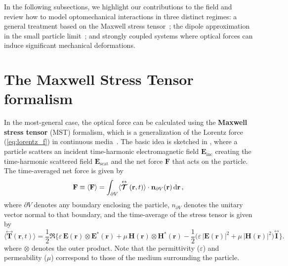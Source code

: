  In the following subsections, we highlight our contributions to the field and review how to model optomechanical interactions in three distinct regimes: a general treatment based on the Maxwell stress tensor~\cite{ownpub2}; 
 the dipole approximation in the small particle limit~\cite{ownpub1, ownpub3}; and strongly coupled systems where optical forces can induce significant mechanical deformations.
\section{The Maxwell Stress Tensor formalism~\cite{ownpub2}}

In the most-general case, the optical force can be calculated using the \textbf{Maxwell stress tensor} (MST) formalism, which is a generalization of the Lorentz force (\eqref{eq:lorentz_f}) in continuous media~\cite{novotny}.
The basic idea is sketched in , where
a particle scatters an incident time-harmonic electromagnetic field $\mathbf{E}_\text{inc}$ creating the time-harmonic scattered field $\mathbf{E}_\text{scat}$ and the net force $\mathbf{F}$ that acts
on the particle. The time-averaged net force is given by~\cite{novotny}
\begin{equation}\label{eq:f_MST}
    \mathbf{F} \equiv \langle\mathbf{F}\rangle=\int_{\partial V}\langle\stackrel{\leftrightarrow}{\bm{\mathcal{T}}}(\mathbf{r}, t)\rangle \cdot \mathbf{n}_{\partial V}(\mathbf{r}) \mathop{}\!\text{d} \mathbf{r}\,,
\end{equation}
where $\partial V$ denotes any boundary enclosing the particle, $n_{\partial V}$ denotes the unitary vector normal to that boundary, and
the time-average of the stress tensor is given by
\begin{equation}
        \langle \stackrel{\leftrightarrow}{\mathbf{T}}(\mathbf{r}, t) \rangle 
        = \frac{1}{2} \Re \Big\{ 
            \varepsilon\, \mathbf{E}(\mathbf{r}) \otimes \mathbf{E}^*(\mathbf{r})
            + \mu\, \mathbf{H}(\mathbf{r}) \otimes \mathbf{H}^*(\mathbf{r})
         - \frac{1}{2} \big( \varepsilon\, |\mathbf{E}(\mathbf{r})|^2 + \mu\, |\mathbf{H}(\mathbf{r})|^2 \big) 
        \stackrel{\leftrightarrow}{\mathbf{I}} \Big\}.
\end{equation}
where $\otimes$ denotes the outer product. Note that the permittivity ($\varepsilon$) and permeability ($\mu$) correspond to those of the medium surrounding the particle.

